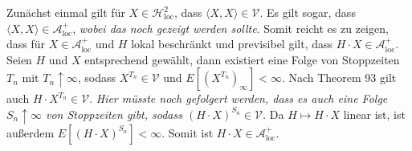 \documentclass{article}
\begin{document}
Zunächst einmal gilt für $X\in\mathscr{H}_{\text{loc}}^2$, dass $\langle X,X\rangle\in\mathscr{V}$.
Es gilt sogar, dass $\langle X,X\rangle\in\mathscr{A}_{\text{loc}}^+$, \emph{wobei das noch gezeigt werden sollte}.
Somit reicht es zu zeigen, dass für $X\in\mathscr{A}_{\text{loc}}^+$ und $H$ lokal beschränkt und previsibel gilt, dass $H\cdot X\in\mathscr{A}_{\text{loc}}^+$.
Seien $H$ und $X$ entsprechend gewählt, dann existiert eine Folge von Stoppzeiten $T_n$ mit $T_n\uparrow\infty$, sodass $X^{T_n}\in\mathscr{V}$ und $E[(X^{T_n})_\infty]<\infty$.
Nach Theorem 93 gilt auch $H\cdot X^{T_n}\in\mathscr{V}$.
\emph{Hier müsste noch gefolgert werden, dass es auch eine Folge $S_n\uparrow\infty$ von Stoppzeiten gibt, sodass $(H\cdot X)^{S_n}\in\mathscr{V}$.}
Da $H\mapsto H\cdot X$ linear ist, ist außerdem $E[(H\cdot X)^{S_n}]<\infty$.
Somit ist $H\cdot X\in\mathscr{A}_{\text{loc}}^+$.

\end{document}
